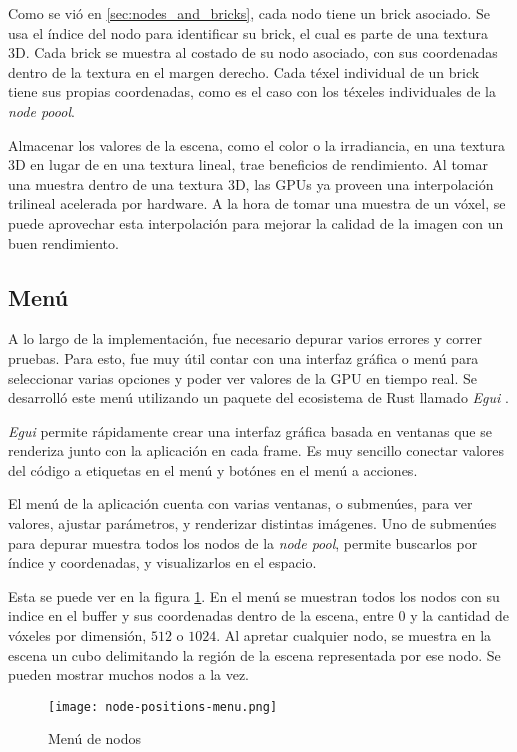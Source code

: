 Como se vió en \ref{sec:nodes_and_bricks}, cada nodo tiene un brick asociado.
Se usa el índice del nodo para identificar su brick, el cual es parte de una textura 3D.
Cada brick se muestra al costado de su nodo asociado, con sus coordenadas dentro de la textura en el margen derecho.
Cada téxel individual de un brick tiene sus propias coordenadas, como es el caso con los téxeles individuales de la \textit{node poool}.

Almacenar los valores de la escena, como el color o la irradiancia, en una textura 3D en lugar de en una textura lineal, trae beneficios de rendimiento.
Al tomar una muestra dentro de una textura 3D, las GPUs ya proveen una interpolación trilineal acelerada por hardware.
A la hora de tomar una muestra de un vóxel, se puede aprovechar esta interpolación para mejorar la calidad de la imagen con un buen rendimiento.

\subsection{Menú}

A lo largo de la implementación, fue necesario depurar varios errores y correr pruebas.
Para esto, fue muy útil contar con una interfaz gráfica o menú para seleccionar varias opciones y poder ver valores de la GPU en tiempo real.
Se desarrolló este menú utilizando un paquete del ecosistema de Rust llamado \textit{Egui} \cite{egui}.

\textit{Egui} permite rápidamente crear una interfaz gráfica basada en ventanas que se renderiza junto con la aplicación en cada frame.
Es muy sencillo conectar valores del código a etiquetas en el menú y botónes en el menú a acciones.

El menú de la aplicación cuenta con varias ventanas, o submenúes, para ver valores, ajustar parámetros, y renderizar distintas imágenes.
Uno de submenúes para depurar muestra todos los nodos de la \textit{node pool}, permite buscarlos por índice y coordenadas, y visualizarlos en el espacio.

Esta se puede ver en la figura \ref{fig:node-positions-menu}.
En el menú se muestran todos los nodos con su indice en el buffer y sus coordenadas dentro de la escena, entre $0$ y la cantidad de vóxeles por dimensión, $512$ o $1024$.
Al apretar cualquier nodo, se muestra en la escena un cubo delimitando la región de la escena representada por ese nodo.
Se pueden mostrar muchos nodos a la vez.

\begin{figure}
    \centering
    \texttt{[image: node-positions-menu.png]}
    \caption{Menú de nodos}
    \label{fig:node-positions-menu}
\end{figure}

